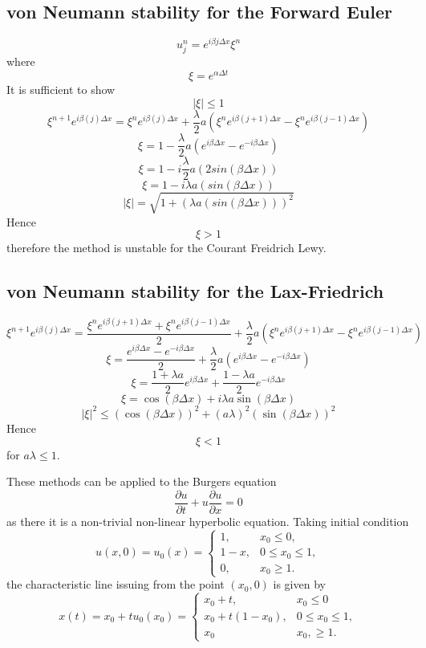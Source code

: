 \subsection{von Neumann stability for the Forward Euler}
\[u_j^n = e^{i\beta j \Delta x} \xi^n \]
where 
\[\xi = e^{\alpha \Delta t}  \]
It is sufficient to show 
\[|\xi| \leq 1 \]
\[ \xi^{n+1}e^{i\beta(j)\Delta x}=\xi^{n}e^{i\beta(j)\Delta x}+\frac{\lambda}{2}a(\xi^{n}e^{i\beta(j+1)\Delta x}-\xi^{n}e^{i\beta(j-1)\Delta x})\]
\[ \xi = 1-\frac{\lambda}{2}a(e^{i\beta\Delta x}-e^{-i\beta\Delta x})\]
\[ \xi = 1-i\frac{\lambda}{2}a(2sin(\beta \Delta x)) \]
\[ \xi = 1-i\lambda a(sin(\beta \Delta x)) \]
\[ |\xi| = \sqrt{1+(\lambda a(sin(\beta \Delta x)))^2} \]
Hence
\[ \xi>1\]
therefore the method is unstable for the Courant Freidrich Lewy.

\subsection{von Neumann stability for the Lax-Friedrich}


\[ \xi^{n+1}e^{i\beta(j)\Delta x}=\frac{\xi^{n}e^{i\beta(j+1)\Delta x}+\xi^{n}e^{i\beta(j-1)\Delta x}}{2}+\frac{\lambda}{2}a(\xi^{n}e^{i\beta(j+1)\Delta x}-\xi^{n}e^{i\beta(j-1)\Delta x})\]
\[ \xi = \frac{e^{i\beta\Delta x}-e^{-i\beta\Delta x}}{2}+\frac{\lambda}{2}a(e^{i\beta\Delta x}-e^{-i\beta\Delta x})\]
\[ \xi = \frac{1+\lambda a}{2}e^{i\beta\Delta x}+\frac{1-\lambda a}{2}e^{-i\beta\Delta x} \]
\[ \xi = \cos(\beta \Delta x)+i\lambda a\sin(\beta \Delta x) \]
\[ |\xi|^2 \leq (\cos(\beta \Delta x))^2+(a \lambda)^2(\sin(\beta \Delta x))^2 \]
Hence
\[ \xi<1\]
for $a \lambda \leq 1$.
\begin{example}
These methods can be applied to the Burgers equation
\[\frac{\partial u}{\partial t}+ u\frac{\partial u}{\partial x} =0 \]
as there it is a non-trivial non-linear hyperbolic equation. Taking initial condition
\[ u(x,0) = u_0(x) = \left\{ \begin{array}{cc} 
1, & x_0\leq 0, \\
1-x, & 0\leq x_0\leq 1, \\
0, & x_0\geq 1. 
 \end{array} \right.\]
the characteristic line issuing from the point $(x_0,0)$ is given by
\[ x(t) = x_0+tu_0(x_0) = \left\{ \begin{array}{cc} 
x_0+t,& x_0\leq 0 \\
x_0+t(1-x_0), & 0\leq x_0\leq 1, \\
x_0 & x_0,\geq 1. 
 \end{array} \right.\]
\end{example}